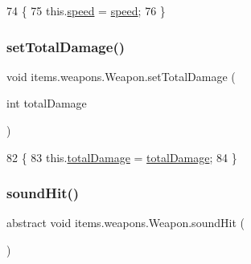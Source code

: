 \begin{DoxyCode}
74                                       \{
75         this.\mbox{\hyperlink{classitems_1_1weapons_1_1_weapon_ac653ddf600cd6add7078dc32b5f1584a}{speed}} = \mbox{\hyperlink{classitems_1_1weapons_1_1_weapon_ac653ddf600cd6add7078dc32b5f1584a}{speed}};
76     \}
\end{DoxyCode}
\mbox{\label{classitems_1_1weapons_1_1_weapon_a8fda5273650d7a1b2be0e8ea8ce1d733}} 
\subsubsection{\texorpdfstring{set\+Total\+Damage()}{setTotalDamage()}}
{\footnotesize\ttfamily void items.\+weapons.\+Weapon.\+set\+Total\+Damage (\begin{DoxyParamCaption}\item[{int}]{total\+Damage }\end{DoxyParamCaption})\hspace{0.3cm}{\ttfamily [inline]}}


\begin{DoxyCode}
82                                                 \{
83         this.\mbox{\hyperlink{classitems_1_1weapons_1_1_weapon_afce1cb3b61716a4880f125ac3bd2856b}{totalDamage}} = \mbox{\hyperlink{classitems_1_1weapons_1_1_weapon_afce1cb3b61716a4880f125ac3bd2856b}{totalDamage}};
84     \}
\end{DoxyCode}
\mbox{\label{classitems_1_1weapons_1_1_weapon_a8a51848ed533654361356bf83697cedb}} 
\subsubsection{\texorpdfstring{sound\+Hit()}{soundHit()}}
{\footnotesize\ttfamily abstract void items.\+weapons.\+Weapon.\+sound\+Hit (\begin{DoxyParamCaption}{ }\end{DoxyParamCaption})\hspace{0.3cm}{\ttfamily [abstract]}}

